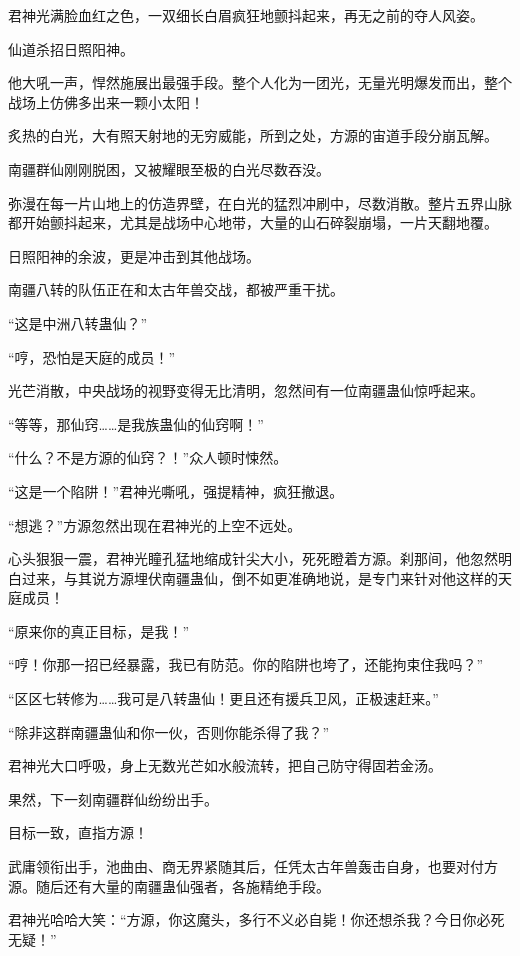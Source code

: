 \begin{this_body}
君神光满脸血红之色，一双细长白眉疯狂地颤抖起来，再无之前的夺人风姿。

仙道杀招日照阳神。

他大吼一声，悍然施展出最强手段。整个人化为一团光，无量光明爆发而出，整个战场上仿佛多出来一颗小太阳！

炙热的白光，大有照天射地的无穷威能，所到之处，方源的宙道手段分崩瓦解。

南疆群仙刚刚脱困，又被耀眼至极的白光尽数吞没。

弥漫在每一片山地上的仿造界壁，在白光的猛烈冲刷中，尽数消散。整片五界山脉都开始颤抖起来，尤其是战场中心地带，大量的山石碎裂崩塌，一片天翻地覆。

日照阳神的余波，更是冲击到其他战场。

南疆八转的队伍正在和太古年兽交战，都被严重干扰。

“这是中洲八转蛊仙？”

“哼，恐怕是天庭的成员！”

光芒消散，中央战场的视野变得无比清明，忽然间有一位南疆蛊仙惊呼起来。

“等等，那仙窍……是我族蛊仙的仙窍啊！”

“什么？不是方源的仙窍？！”众人顿时悚然。

“这是一个陷阱！”君神光嘶吼，强提精神，疯狂撤退。

“想逃？”方源忽然出现在君神光的上空不远处。

心头狠狠一震，君神光瞳孔猛地缩成针尖大小，死死瞪着方源。刹那间，他忽然明白过来，与其说方源埋伏南疆蛊仙，倒不如更准确地说，是专门来针对他这样的天庭成员！

“原来你的真正目标，是我！”

“哼！你那一招已经暴露，我已有防范。你的陷阱也垮了，还能拘束住我吗？”

“区区七转修为……我可是八转蛊仙！更且还有援兵卫风，正极速赶来。”

“除非这群南疆蛊仙和你一伙，否则你能杀得了我？”

君神光大口呼吸，身上无数光芒如水般流转，把自己防守得固若金汤。

果然，下一刻南疆群仙纷纷出手。

目标一致，直指方源！

武庸领衔出手，池曲由、商无界紧随其后，任凭太古年兽轰击自身，也要对付方源。随后还有大量的南疆蛊仙强者，各施精绝手段。

君神光哈哈大笑：“方源，你这魔头，多行不义必自毙！你还想杀我？今日你必死无疑！”


\end{this_body}
